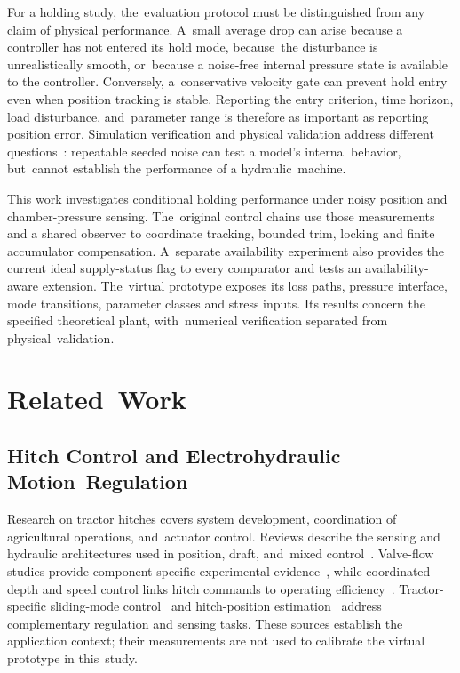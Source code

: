 \documentclass[machines,article,submit,pdftex,moreauthors]{Definitions/mdpi}
\begin{document}
For a holding study, the~evaluation protocol must be distinguished from any claim of physical performance. A~small average drop can arise because a controller has not entered its hold mode, because~the disturbance is unrealistically smooth, or~because a noise-free internal pressure state is available to the controller. Conversely, a~conservative velocity gate can prevent hold entry even when position tracking is stable. Reporting the entry criterion, time horizon, load disturbance, and~parameter range is therefore as important as reporting position error. Simulation verification and physical validation address different questions~\cite{sargent2013}: repeatable seeded noise can test a model's internal behavior, but~cannot establish the performance of a hydraulic~machine.

This work investigates conditional holding performance under noisy position and chamber-pressure sensing. The~original control chains use those measurements and a shared observer to coordinate tracking, bounded trim, locking and finite accumulator compensation. A~separate availability experiment also provides the current ideal supply-status flag to every comparator and tests an availability-aware extension. The~virtual prototype exposes its loss paths, pressure interface, mode transitions, parameter classes and stress inputs. Its results concern the specified theoretical plant, with~numerical verification separated from physical~validation.

\section{Related~Work}
\unskip
\subsection{Hitch Control and Electrohydraulic Motion~Regulation}
Research on tractor hitches covers system development, coordination of agricultural operations, and~actuator control. Reviews describe the sensing and hydraulic architectures used in position, draft, and~mixed control~\cite{sun2022}. Valve-flow studies provide component-specific experimental evidence~\cite{kumar2021}, while coordinated depth and speed control links hitch commands to operating efficiency~\cite{sun2025}. Tractor-specific sliding-mode control~\cite{liu2023} and hitch-position estimation~\cite{kim2025} address complementary regulation and sensing tasks. These sources establish the application context; their measurements are not used to calibrate the virtual prototype in this~study.
\end{document}

